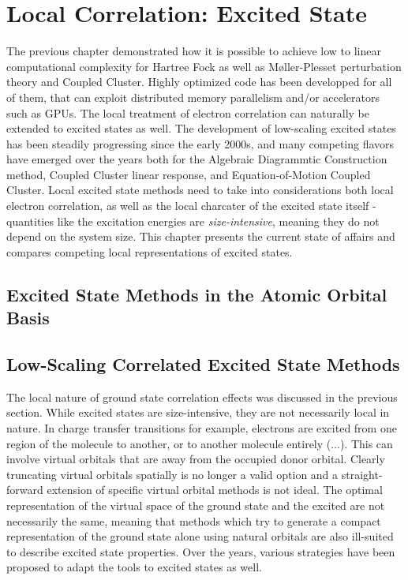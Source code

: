 \chapter{Local Correlation: Excited State}

The previous chapter demonstrated how it is possible to achieve low to linear computational complexity for Hartree Fock as well as M{\o}ller-Plesset perturbation theory and Coupled Cluster. Highly optimized code has been developped for all of them, that can exploit distributed memory parallelism and/or accelerators such as GPUs. The local treatment of electron correlation can naturally be extended to excited states as well. The development of low-scaling excited states has been steadily progressing since the early 2000s, and many competing flavors have emerged over the years both for the Algebraic Diagrammtic Construction method, Coupled Cluster linear response, and Equation-of-Motion Coupled Cluster. Local excited state methods need to take into considerations both local electron correlation, as well as the local charcater of the excited state itself - quantities like the excitation energies are \emph{size-intensive}, meaning they do not depend on the system size. This chapter presents the current state of affairs and compares competing local representations of excited states. 


\section{Excited State Methods in the Atomic Orbital Basis}



\section{Low-Scaling Correlated Excited State Methods}

The local nature of ground state correlation effects was discussed in the previous section. While excited states are size-intensive, they are not necessarily local in nature. In charge transfer transitions for example, electrons are excited from one region of the molecule to another, or to another molecule entirely (...). This can involve virtual orbitals that are away from the occupied donor orbital. Clearly truncating virtual orbitals spatially is no longer a valid option and a straight-forward extension of specific virtual orbital methods is not ideal. The optimal representation of the virtual space of the ground state and the excited are not necessarily the same, meaning that methods which try to generate a compact representation of the ground state alone using natural orbitals are also ill-suited to describe excited state properties. Over the years, various strategies have been proposed to adapt the tools to excited states as well. 

